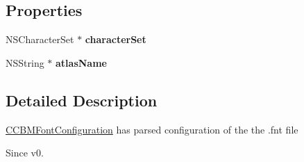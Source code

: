 \subsection*{Properties}
\begin{DoxyCompactItemize}
\item 
\hypertarget{interface_c_c_b_m_font_configuration_a4af5d3a5c3cb981f7fd5d38b6e4b17cb}{N\-S\-Character\-Set $\ast$ {\bfseries character\-Set}}\label{interface_c_c_b_m_font_configuration_a4af5d3a5c3cb981f7fd5d38b6e4b17cb}

\item 
\hypertarget{interface_c_c_b_m_font_configuration_a88b7cc1fe74609247a09bb99b90f74eb}{N\-S\-String $\ast$ {\bfseries atlas\-Name}}\label{interface_c_c_b_m_font_configuration_a88b7cc1fe74609247a09bb99b90f74eb}

\end{DoxyCompactItemize}


\subsection{Detailed Description}
\hyperlink{interface_c_c_b_m_font_configuration}{C\-C\-B\-M\-Font\-Configuration} has parsed configuration of the the .fnt file \begin{DoxySince}{Since}
v0. 
\end{DoxySince}


